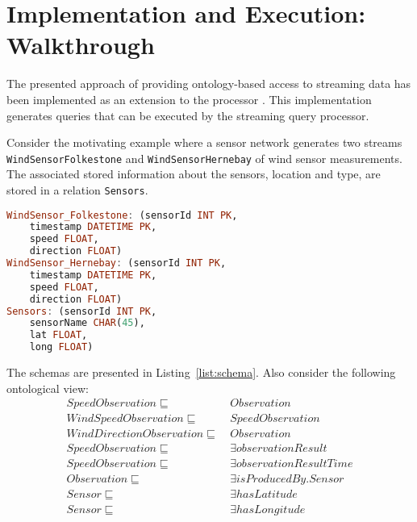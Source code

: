 \section{Implementation and Execution: Walkthrough}
\label{execution}

The presented approach of providing ontology-based access to streaming data has been implemented as an extension to the \odemapster processor \cite{Barrasa_04}. 
This implementation generates \sneeql queries that can be executed by the streaming query processor.


Consider the motivating example where a sensor network generates two streams \texttt{WindSensorFolkestone} and \texttt{WindSensorHernebay} of wind sensor measurements.
The associated stored information about the sensors, \eg location and type, are stored in a relation \texttt{Sensors}.

\begin{lstlisting}[style=SNEEqlStyle,language=Haskell,label=list:schema,caption=Relational schema of the stream data source.]
WindSensor_Folkestone: (sensorId INT PK, 
	timestamp DATETIME PK, 
	speed FLOAT, 
	direction FLOAT)
WindSensor_Hernebay: (sensorId INT PK, 
	timestamp DATETIME PK, 
	speed FLOAT, 
	direction FLOAT)
Sensors: (sensorId INT PK, 
	sensorName CHAR(45), 
	lat FLOAT, 
	long FLOAT)
\end{lstlisting}

The schemas are presented in Listing~\ref{list:schema}. Also consider the following ontological view:
\vspace{-10pt}
\small
\begin{align*}%
SpeedObservation \sqsubseteq\ & Observation \\
WindSpeedObservation \sqsubseteq\ & SpeedObservation \\
WindDirectionObservation \sqsubseteq\ & Observation \\
SpeedObservation \sqsubseteq\ & \exists observationResult \\
SpeedObservation \sqsubseteq\ & \exists observationResultTime \\
Observation \sqsubseteq\ & \exists isProducedBy.Sensor \\
Sensor \sqsubseteq\ & \exists hasLatitude \\
Sensor \sqsubseteq\ & \exists hasLongitude \\
\end{align*}

